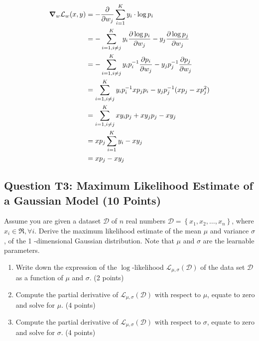 \documentclass[10pt]{article}
\begin{document}
\begin{align*}
  \grad_{w}{\mathcal{L}_{w}(x,y)} &=-\pdv{}{w_j}\sum_{i=1}^{K} y_{i} \cdot \log p_{i} \\
  &=-\sum_{i=1, i\neq j}^{K} y_{i} \pdv{\log p_{i}}{w_j} - y_j \pdv{\log p_{j}}{w_j}  \\
  &=-\sum_{i=1, i\neq j}^{K} y_{i} p_i^{-1} \pdv{p_{i}}{w_j} - y_j p_j^{-1} \pdv{p_{j}}{w_j}  \\
  &=\sum_{i=1, i\neq j}^{K} y_{i} p_i^{-1} x p_j p_i - y_j p_j^{-1} (x p_{j}- x p^2_{j})  \\
  &=\sum_{i=1, i\neq j}^{K} x y_{i} p_j + x y_j p_{j} - x y_j   \\
  &=x p_j \sum_{i=1}^{K} y_{i} - x y_j   \\
  &= x p_j - x y_j
  \end{align*}

\subsection*{Question T3: Maximum Likelihood Estimate of a Gaussian Model (10 Points)}
Assume you are given a dataset $\mathcal{D}$ of $n$ real numbers $\mathcal{D}=\left\{x_{1}, x_{2}, \ldots, x_{n}\right\}$, where $x_{i} \in \Re, \forall i$. Derive the maximum likelihood estimate of the mean $\mu$ and variance $\sigma$, of the 1 -dimensional Gaussian distribution. Note that $\mu$ and $\sigma$ are the learnable parameters.

\begin{enumerate}
  \item Write down the expression of the $\log$-likelihood $\mathcal{L}_{\mu, \sigma}(\mathcal{D})$ of the data set $\mathcal{D}$ as a function of $\mu$ and $\sigma$. (2 points)

  \item Compute the partial derivative of $\mathcal{L}_{\mu, \sigma}(\mathcal{D})$ with respect to $\mu$, equate to zero and solve for $\mu$. (4 points)

  \item Compute the partial derivative of $\mathcal{L}_{\mu, \sigma}(\mathcal{D})$ with respect to $\sigma$, equate to zero and solve for $\sigma$. (4 points)

\end{enumerate}
\end{document}
